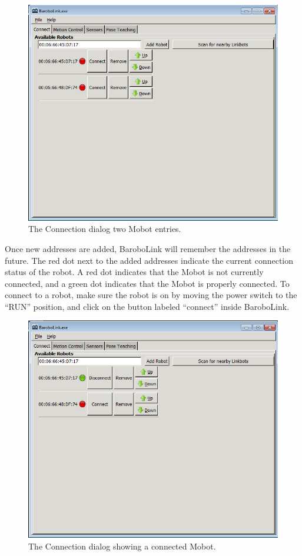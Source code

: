 \documentclass{article}
\begin{document}
\begin{figure}[H]
\begin{center}
\includegraphics[width=4.5in]{images/robomancer_screenshot4.png}
\end{center}
\caption{\label{fig:shot4_a.png} The Connection dialog two Mobot entries.}
\end{figure}

Once new addresses are added, BaroboLink will remember the addresses in the future. 
The red dot next to the added addresses indicate
the current connection status of the robot. A red dot indicates that the Mobot
is not currently connected, and a green dot indicates that the Mobot is 
properly connected. To connect to a robot, make sure the robot is on by moving the 
power switch to the ``RUN'' position, and click on the button labeled ``connect'' 
inside BaroboLink.

\begin{figure}[H]
\begin{center}
\includegraphics[width=4.5in]{images/robomancer_screenshot4_connected.png}
\end{center}
\caption{\label{fig:shot4.png} The Connection dialog showing a connected Mobot.}
\end{figure}
\end{document}
